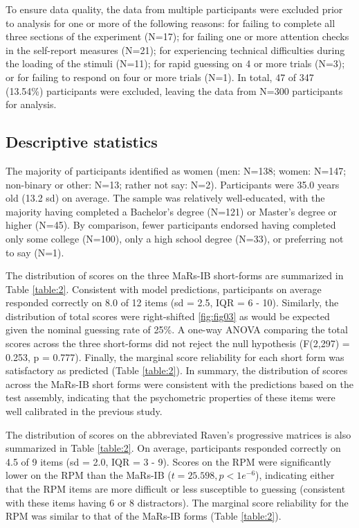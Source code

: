 \documentclass[a4paper,man,natbib]{apa6}
\begin{document}
To ensure data quality, the data from multiple participants were excluded prior to analysis for one or more of the following reasons: for failing to complete all three sections of the experiment (N=17); for failing one or more attention checks \citep{zorowitz2021inattentive} in the self-report measures (N=21); for experiencing technical difficulties during the loading of the stimuli (N=11); for rapid guessing on 4 or more trials (N=3); or for failing to respond on four or more trials (N=1). In total, 47 of 347 (13.54\%) participants were excluded, leaving the data from N=300 participants for analysis.

\subsection{Descriptive statistics}

The majority of participants identified as women (men: N=138; women: N=147; non-binary or other: N=13; rather not say: N=2). Participants were 35.0 years old (13.2 sd) on average. The sample was relatively well-educated, with the majority having completed a Bachelor's degree (N=121) or Master's degree or higher (N=45). By comparison, fewer participants endorsed having completed only some college (N=100), only a high school degree (N=33), or preferring not to say (N=1). 

The distribution of scores on the three MaRs-IB short-forms are summarized in Table \ref{table:2}. Consistent with model predictions, participants on average responded correctly on 8.0 of 12 items (sd = 2.5, IQR = 6 - 10). Similarly, the distribution of total scores were right-shifted \ref{fig:fig03} as would be expected given the nominal guessing rate of 25\%. A one-way ANOVA comparing the total scores across the three short-forms did not reject the null hypothesis (F(2,297) = 0.253, p = 0.777). Finally, the marginal score reliability for each short form was satisfactory as predicted (Table \ref{table:2}). In summary, the distribution of scores across the MaRs-IB short forms were consistent with the predictions based on the test assembly, indicating that the psychometric properties of these items were well calibrated in the previous study.

The distribution of scores on the abbreviated Raven's progressive matrices is also summarized in Table \ref{table:2}. On average, participants responded correctly on 4.5 of 9 items (sd = 2.0, IQR = 3 - 9). Scores on the RPM were significantly lower on the RPM than the MaRs-IB ($t = 25.598, p < 1e^{-6}$), indicating either that the RPM items are more difficult or less susceptible to guessing (consistent with these items having 6 or 8 distractors). The marginal score reliability for the RPM was similar to that of the MaRs-IB forms (Table \ref{table:2}). 
\end{document}
